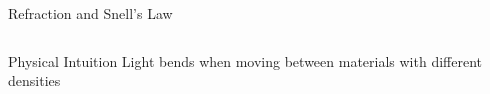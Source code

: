 \begin{frame}{Refraction and Snell's Law}
\begin{columns}
\begin{column}{0.5\textwidth}
        \end{column}
    \end{columns}

    \begin{conceptbox}{Physical Intuition}
        Light bends when moving between materials with different densities
    \end{conceptbox}
\end{frame}


